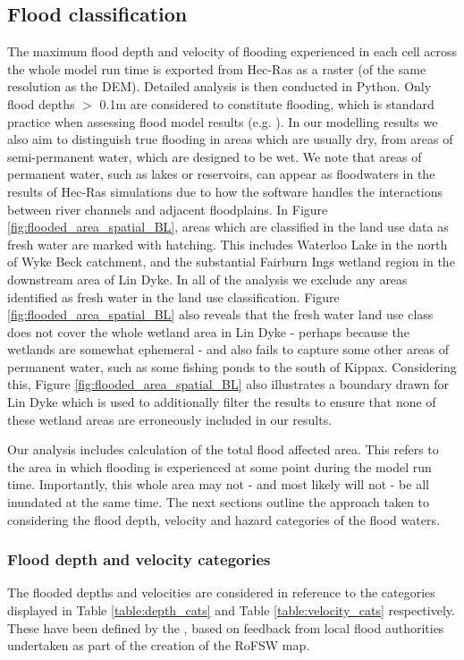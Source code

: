 \documentclass[APA,Times2COL]{WileyNJDv5}
\begin{document}
\subsection{Flood classification}\label{subsec:model:data_analysis}
The maximum flood depth and velocity of flooding experienced in each cell across the whole model run time is exported from Hec-Ras as a raster (of the same resolution as the DEM). Detailed analysis is then conducted in Python. Only flood depths $>$ 0.1m are considered to constitute flooding, which is standard practice when assessing flood model results (e.g. \citet{houston2011pluvial, smith2019new}). In our modelling results we also aim to distinguish true flooding in areas which are usually dry, from areas of semi-permanent water, which are designed to be wet. We note that areas of permanent water, such as lakes or reservoirs, can appear as floodwaters in the results of Hec-Ras simulations due to how the software handles the interactions between river channels and adjacent floodplains. In Figure \ref{fig:flooded_area_spatial_BL}, areas which are classified in the land use data as fresh water are marked with hatching. This includes Waterloo Lake in the north of Wyke Beck catchment, and the substantial Fairburn Ings wetland region in the downstream area of Lin Dyke. In all of the analysis we exclude any areas identified as fresh water in the land use classification. Figure \ref{fig:flooded_area_spatial_BL} also reveals that the fresh water land use class does not cover the whole wetland area in Lin Dyke - perhaps because the wetlands are somewhat ephemeral - and also fails to capture some other areas of permanent water, such as some fishing ponds to the south of Kippax. Considering this, Figure \ref{fig:flooded_area_spatial_BL} also illustrates a boundary drawn for Lin Dyke which is used to additionally filter the results to ensure that none of these wetland areas are erroneously included in our results.

Our analysis includes calculation of the total flood affected area. This refers to the area in which flooding is experienced at some point during the model run time. Importantly, this whole area may not - and most likely will not - be all inundated at the same time. The next sections outline the approach taken to considering the flood depth, velocity and hazard categories of the flood waters.

\subsubsection{Flood depth and velocity categories}\label{sec:sec:depth_cat}
The flooded depths and velocities are considered in reference to the categories displayed in Table \ref{table:depth_cats} and Table \ref{table:velocity_cats} respectively. These have been defined by the \citet{envagency2019}, based on feedback from local flood authorities undertaken as part of the creation of the RoFSW map.
\end{document}
